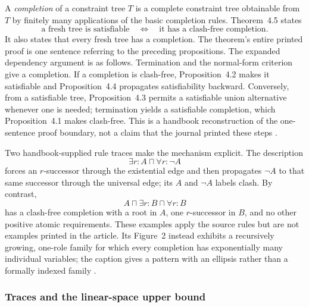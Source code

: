 A \emph{completion} of a constraint tree \(T\) is a complete constraint tree
obtainable from \(T\) by finitely many applications of the basic completion
rules.  Theorem~4.5 states
\[
 \boxed{
 \text{a fresh tree is satisfiable}
 \quad\Longleftrightarrow\quad
 \text{it has a clash-free completion}.}
\]
It also states that every fresh tree has a completion.  The theorem's entire
printed proof is one sentence referring to the preceding propositions.  The
expanded dependency argument is as follows.  Termination and the normal-form
criterion give a completion.  If a completion is clash-free,
Proposition~4.2 makes it satisfiable and Proposition~4.4 propagates
satisfiability backward.  Conversely, from a satisfiable tree,
Proposition~4.3 permits a satisfiable union alternative whenever one is
needed; termination yields a satisfiable completion, which
Proposition~4.1 makes clash-free.  This is a handbook reconstruction of the
one-sentence proof boundary, not a claim that the journal printed these
steps
\cite[Thm.~4.5, p.~13]{SchmidtSchaussSmolka1991}.

Two handbook-supplied rule traces make the mechanism explicit.  The
description
\[
 \exists r:A\sqcap\forall r:\neg A
\]
forces an \(r\)-successor through the existential edge and then propagates
\(\neg A\) to that same successor through the universal edge; its \(A\) and
\(\neg A\) labels clash.  By contrast,
\[
 A\sqcap\exists r:B\sqcap\forall r:B
\]
has a clash-free completion with a root in \(A\), one \(r\)-successor in
\(B\), and no other positive atomic requirements.  These examples apply the
source rules but are not examples printed in the article.  Its Figure~2
instead exhibits a recursively growing, one-role family for which every
completion has exponentially many individual variables; the caption gives a
pattern with an ellipsis rather than a formally indexed family
\cite[Fig.~2, p.~13]{SchmidtSchaussSmolka1991}.

\subsubsection{Traces and the linear-space upper bound}

